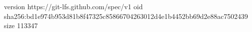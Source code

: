 version https://git-lfs.github.com/spec/v1
oid sha256:bd1e974b953d81b8f47325c85866704263012d4e1b4452bb69d2e88ac7502439
size 113347
